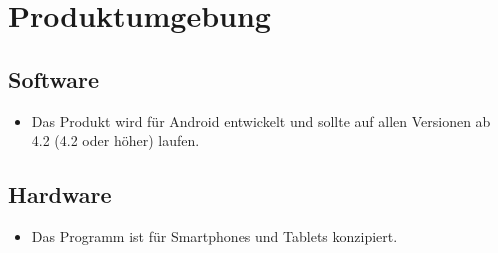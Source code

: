\section{Produktumgebung}

\subsection{Software}
\begin{itemize}
	\item Das Produkt wird für Android entwickelt und sollte auf allen Versionen ab 4.2 (4.2 oder höher) laufen.
\end{itemize}

\subsection{Hardware}
\begin{itemize}
	\item Das Programm ist für Smartphones und Tablets konzipiert.
\end{itemize}
